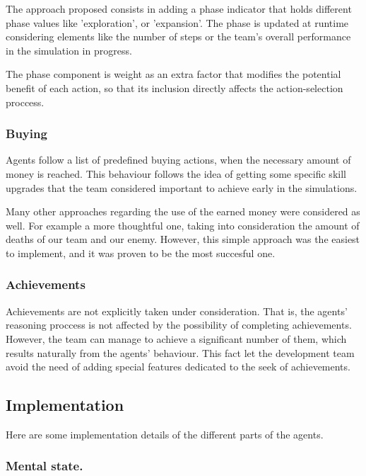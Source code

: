 \documentclass{llncs2e/llncs}
\begin{document}
    The approach proposed consists in adding a phase indicator that holds different 
    phase values like 'exploration', or 'expansion'. The phase is updated at runtime
    considering elements like the number of steps or the team's overall performance 
    in the simulation in progress.
    
    The phase component is weight as an extra factor that modifies the potential 
    benefit of each action, so that its inclusion directly affects the action-selection 
    proccess.
    
\subsubsection{Buying}

    Agents follow a list of predefined buying actions, when the necessary amount 
    of money is reached. This behaviour follows the idea of getting some specific skill 
    upgrades that the team considered important to achieve early in the simulations.
    
    Many other approaches regarding the use of the earned money were considered as well.
    For example a more thoughtful one, taking into consideration the amount of deaths 
    of our team and our enemy. However, this simple approach was the easiest to implement, 
    and it was proven to be the most succesful one.

\subsubsection{Achievements}

    Achievements are not explicitly taken under consideration. That is, the agents'
    reasoning proccess is not affected by the possibility of completing achievements.    
    However, the team can manage to achieve a significant number of them, which 
    results naturally from the agents' behaviour. 
    This fact let the development team avoid the need of adding special features 
    dedicated to the seek of achievements.
    
\subsection{Implementation}

    Here are some implementation details of the different parts of the agents.
    
\subsubsection{Mental state.}
\end{document}
